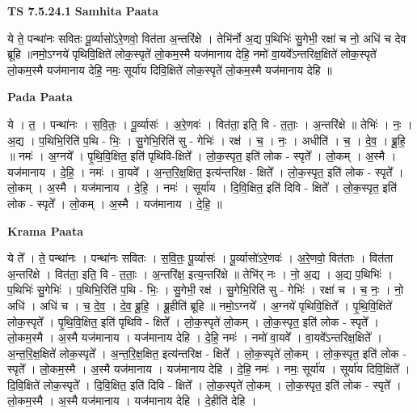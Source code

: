 \documentclass[17pt]{extarticle}
\begin{document}
\textbf{TS 7.5.24.1 } \newline
\textbf{Samhita Paata} \newline

ये ते॒ पन्था॑नः सवितः पू॒र्व्यासो॑ऽरे॒णवो॒ वित॑ता अ॒न्तरि॑क्षे । तेभि॑र्नो अ॒द्य प॒थिभिः॑ सु॒गेभी॒ रक्षा॑ च नो॒ अधि॑ च देव ब्रूहि ॥नमो॒ऽग्नये॑ पृथिवि॒क्षिते॑ लोक॒स्पृते॑ लो॒कम॒स्मै यज॑मानाय देहि॒ नमो॑ वा॒यवे᳚ऽन्तरिक्ष॒क्षिते॑ लोक॒स्पृते॑ लो॒कम॒स्मै यज॑मानाय देहि॒ नमः॒ सूर्या॑य दिवि॒क्षिते॑ लोक॒स्पृते॑ लो॒कम॒स्मै यज॑मानाय देहि ॥ \newline

\textbf{Pada Paata} \newline

ये । त॒ । पन्था॑नः । स॒वि॒तः॒ । पू॒र्व्यासः॑ । अ॒रे॒णवः॑ । वित॑ता॒ इति॒ वि - त॒ताः॒ । अ॒न्तरि॑क्षे ॥ तेभिः॑ । नः॒ । अ॒द्य । प॒थिभि॒रिति॑ प॒थि - भिः॒ । सु॒गेभि॒रिति॑ सु - गेभिः॑ । रक्ष॑ । च॒ । नः॒ । अधीति॑ । च॒ । दे॒व॒ । ब्रू॒हि॒ ॥ नमः॑ । अ॒ग्नये᳚ । पृ॒थि॒वि॒क्षित॒ इति॑ पृथिवि-क्षिते᳚ । लो॒क॒स्पृत॒ इति॑ लोक - स्पृते᳚ । लो॒कम् । अ॒स्मै । यज॑मानाय । दे॒हि॒ । नमः॑ । वा॒यवे᳚ । अ॒न्त॒रि॒क्ष॒क्षित॒ इत्य॑न्तरिक्ष - क्षिते᳚ । लो॒क॒स्पृत॒ इति॑ लोक - स्पृते᳚ । लो॒कम् । अ॒स्मै । यज॑मानाय । दे॒हि॒ । नमः॑ । सूर्या॑य । दि॒वि॒क्षित॒ इति॑ दिवि - क्षिते᳚ । लो॒क॒स्पृत॒ इति॑ लोक - स्पृते᳚ । लो॒कम् । अ॒स्मै । यज॑मानाय । दे॒हि॒ ॥  \newline


\textbf{Krama Paata} \newline

ये ते᳚ । ते॒ पन्था॑नः । पन्था॑नः सवितः । स॒वि॒तः॒ पू॒र्व्यासः॑ । पू॒र्व्यासो॑ऽरे॒णवः॑ । अ॒रे॒णवो॒ वित॑ताः । वित॑ता अ॒न्तरि॑क्षे । वित॑ता॒ इति॒ वि - त॒ताः॒ । अ॒न्तरि॑क्ष॒ इत्य॒न्तरि॑क्षे ॥ तेभि॑र् नः । नो॒ अ॒द्य । अ॒द्य प॒थिभिः॑ । प॒थिभिः॑ सु॒गेभिः॑ । प॒थिभि॒रिति॑ प॒थि - भिः॒ । सु॒गेभी॒ रक्ष॑ । सु॒गेभि॒रिति॑ सु - गेभिः॑ । रक्षा॑ च । च॒ नः॒ । नो॒ अधि॑ । अधि॑ च । च॒ दे॒व॒ । दे॒व॒ ब्रू॒हि॒ । ब्रू॒हीति॑ ब्रूहि ॥ नमो॒ऽग्नये᳚ । अ॒ग्नये॑ पृथिवि॒क्षिते᳚ । पृ॒थि॒वि॒क्षिते॑ लोक॒स्पृते᳚ । पृ॒थि॒वि॒क्षित॒ इति॑ पृथिवि - क्षिते᳚ । लो॒क॒स्पृते॑ लो॒कम् । लो॒क॒स्पृत॒ इति॑ लोक - स्पृते᳚ । लो॒कम॒स्मै । अ॒स्मै यज॑मानाय । यज॑मानाय देहि । दे॒हि॒ नमः॑ । नमो॑ वा॒यवे᳚ । वा॒यवे᳚ऽन्तरिक्ष॒क्षिते᳚ । अ॒न्त॒रि॒क्ष॒क्षिते॑ लोक॒स्पृते᳚ । अ॒न्त॒रि॒क्ष॒क्षित॒ इत्य॑न्तरिक्ष - क्षिते᳚ । लो॒क॒स्पृते॑ लो॒कम् । लो॒क॒स्पृत॒ इति॑ लोक - स्पृते᳚ । लो॒कम॒स्मै । अ॒स्मै यज॑मानाय । यज॑मानाय देहि । दे॒हि॒ नमः॑ । नमः॒ सूर्या॑य । सूर्या॑य दिवि॒क्षिते᳚ । दि॒वि॒क्षिते॑ लोक॒स्पृते᳚ । दि॒वि॒क्षित॒ इति॑ दिवि - क्षिते᳚ । लो॒क॒स्पृते॑ लो॒कम् । लो॒क॒स्पृत॒ इति॑ लोक - स्पृते᳚ । लो॒कम॒स्मै । अ॒स्मै यज॑मानाय । यज॑मानाय देहि । दे॒हीति॑ देहि । \newline
\end{document}
